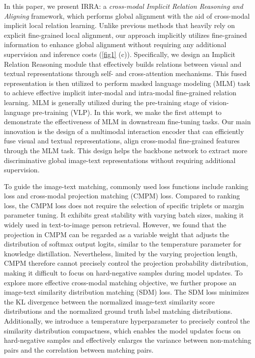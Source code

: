 \documentclass[10pt,twocolumn,letterpaper]{article}
\begin{document}
In this paper, we present IRRA: a \textit{cross-modal Implicit Relation Reasoning and Aligning} framework, which performs global alignment with the aid of cross-modal implicit local relation learning. 
Unlike previous methods that heavily rely on explicit fine-grained local alignment, our approach implicitly utilizes fine-grained information to enhance global alignment without requiring any additional supervision and inference costs (\cref{fig1} (c)).
Specifically, we design an Implicit Relation Reasoning module that effectively builds relations between visual and textual representations through self- and cross-attention mechanisms.
This fused representation is then utilized to perform masked language modeling (MLM) task to achieve effective implicit inter-modal and intra-modal fine-grained relation learning.
MLM is generally utilized during the pre-training stage of vision-language pre-training (VLP)\cite{lu2019vilbert,chen2020uniter,su2019vl,li2021align,dou2022empirical}. In this work, we make the first attempt to demonstrate the effectiveness of MLM in downstream fine-tuning tasks. Our main innovation is the design of a multimodal interaction encoder that can efficiently fuse visual and textual representations, align cross-modal fine-grained features through the MLM task. This design helps the backbone network to extract more discriminative global image-text representations without requiring additional supervision.
 
To guide the image-text matching, commonly used loss functions include ranking loss and cross-modal projection matching (CMPM) \cite{zhang2018deep} loss. Compared to ranking loss, the CMPM loss does not require the selection of specific triplets or margin parameter tuning. It exhibits great stability with varying batch sizes, making it widely  used in text-to-image person retrieval\cite{yan2022clip, shu2022see,chen2022tipcb}. However, we found that the projection in CMPM can be regarded as a variable weight that adjusts the distribution of softmax output logits, similar to the temperature parameter\cite{hinton2015distilling} for knowledge distillation. Nevertheless, limited by the varying projection length, CMPM therefore cannot precisely control the projection probability distribution, making it difficult to focus on hard-negative samples during model updates.
To explore more effective cross-modal matching objective, we further propose an image-text similarity distribution matching (SDM) loss.
The SDM loss minimizes the KL divergence between the normalized image-text similarity score distributions and the normalized ground truth label matching distributions. 
Additionally, we introduce a temperature hyperparameter to precisely control the similarity distribution compactness, which enables the model updates focus on hard-negative samples and effectively enlarges the variance between non-matching pairs and the correlation between matching pairs.
\end{document}
